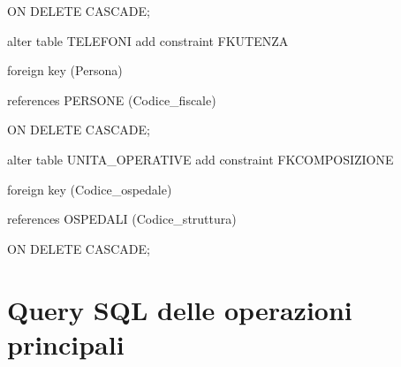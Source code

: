 \documentclass[a4paper,12pt]{report}
\begin{document}
     ON DELETE CASCADE; \newline

\noindent alter table TELEFONI add constraint FKUTENZA

     foreign key (Persona)

     references PERSONE (Codice\_fiscale)

     ON DELETE CASCADE; \newline

\noindent alter table UNITA\_OPERATIVE add constraint FKCOMPOSIZIONE

     foreign key (Codice\_ospedale)

     references OSPEDALI (Codice\_struttura)

     ON DELETE CASCADE; \newline

\chapter{Query SQL delle operazioni principali}
\end{document}
